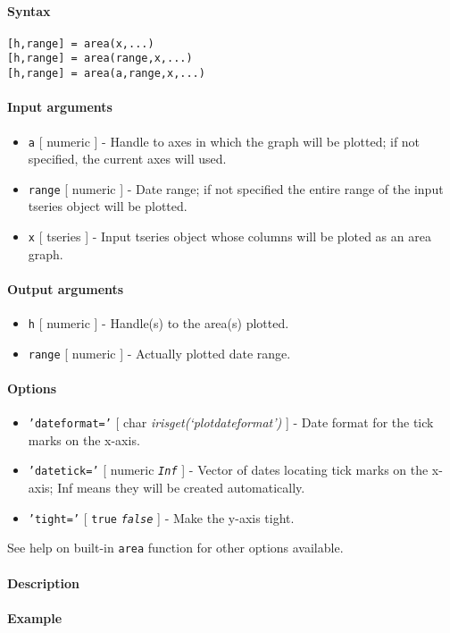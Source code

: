 


	\paragraph{Syntax}\label{syntax}

\begin{verbatim}
[h,range] = area(x,...)
[h,range] = area(range,x,...)
[h,range] = area(a,range,x,...)
\end{verbatim}

\paragraph{Input arguments}\label{input-arguments}

\begin{itemize}
\item
  \texttt{a} {[} numeric {]} - Handle to axes in which the graph will be
  plotted; if not specified, the current axes will used.
\item
  \texttt{range} {[} numeric {]} - Date range; if not specified the
  entire range of the input tseries object will be plotted.
\item
  \texttt{x} {[} tseries {]} - Input tseries object whose columns will
  be ploted as an area graph.
\end{itemize}

\paragraph{Output arguments}\label{output-arguments}

\begin{itemize}
\item
  \texttt{h} {[} numeric {]} - Handle(s) to the area(s) plotted.
\item
  \texttt{range} {[} numeric {]} - Actually plotted date range.
\end{itemize}

\paragraph{Options}\label{options}

\begin{itemize}
\item
  \texttt{'dateformat='} {[} char \textbar{}
  \emph{irisget(`plotdateformat')} {]} - Date format for the tick marks
  on the x-axis.
\item
  \texttt{'datetick='} {[} numeric \textbar{} \emph{\texttt{Inf}} {]} -
  Vector of dates locating tick marks on the x-axis; Inf means they will
  be created automatically.
\item
  \texttt{'tight='} {[} \texttt{true} \textbar{} \emph{\texttt{false}}
  {]} - Make the y-axis tight.
\end{itemize}

See help on built-in \texttt{area} function for other options available.

\paragraph{Description}\label{description}

\paragraph{Example}\label{example}


